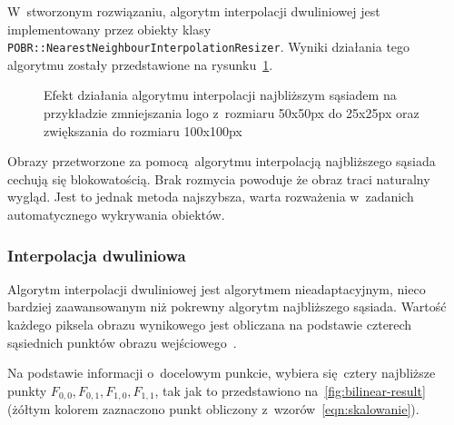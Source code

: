 W~stworzonym rozwiązaniu, algorytm interpolacji dwuliniowej jest implementowany przez  obiekty klasy \texttt{POBR::NearestNeighbourInterpolationResizer}. Wyniki działania tego algorytmu zostały przedstawione na rysunku~\ref{fig:nearestneighbour-result}. 

\begin{figure}[h]
    \centering
    \qquad
    \qquad
    \caption{Efekt działania algorytmu interpolacji najbliższym sąsiadem na przykładzie zmniejszania logo \bk z~rozmiaru 50x50px do 25x25px oraz zwiększania do rozmiaru 100x100px}
    \label{fig:nearestneighbour-result}
\end{figure}

Obrazy przetworzone za pomocą algorytmu interpolacją najbliższego sąsiada cechują się blokowatością. Brak rozmycia powoduje że obraz traci naturalny wygląd. Jest to jednak metoda najszybsza, warta rozważenia w~zadanich automatycznego wykrywania obiektów.

\subsubsection{Interpolacja dwuliniowa}
Algorytm interpolacji dwuliniowej jest algorytmem nieadaptacyjnym, nieco bardziej zaawansowanym niż pokrewny algorytm najbliższego sąsiada. Wartość każdego piksela obrazu wynikowego jest obliczana na podstawie czterech sąsiednich punktów obrazu wejściowego~\cite{algorytmy:bilinear}.

Na podstawie informacji o~docelowym punkcie, wybiera się cztery najbliższe punkty $F_{0,0}, F_{0,1}, F_{1,0}, F_{1,1}$, tak jak to przedstawiono na~\ref{fig:bilinear-result} (żółtym kolorem zaznaczono punkt obliczony z~wzorów~\ref{eqn:skalowanie}). 


